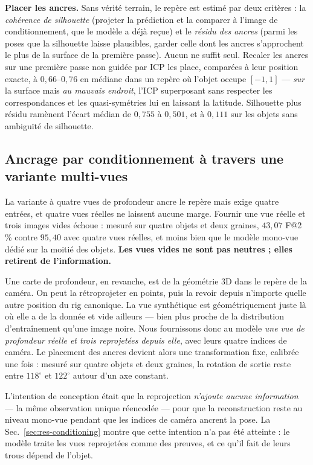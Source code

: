 \documentclass[conference]{IEEEtran}
\makeatletter
\newcommand{\Fs}{F@2\,\%}
\makeatother
\begin{document}
\textbf{Placer les ancres.} Sans vérité terrain, le repère est estimé par deux
critères : la \emph{cohérence de silhouette} (projeter la prédiction et la comparer à
l'image de conditionnement, que le modèle a déjà reçue) et le \emph{résidu des ancres}
(parmi les poses que la silhouette laisse plausibles, garder celle dont les ancres
s'approchent le plus de la surface de la première passe). Aucun ne suffit seul.
Recaler les ancres sur une première passe non guidée par ICP les place, comparées à
leur position exacte, à $0{,}66$--$0{,}76$ en médiane dans un repère où l'objet occupe
$[-1,1]$ --- \emph{sur} la surface mais \emph{au mauvais endroit}, l'ICP superposant
sans respecter les correspondances et les quasi-symétries lui en laissant la latitude.
Silhouette plus résidu ramènent l'écart médian de $0{,}755$ à $0{,}501$, et à
$0{,}111$ sur les objets sans ambiguïté de silhouette.

\subsection{Ancrage par conditionnement à travers une variante multi-vues}
\label{sec:conditioning}

La variante à quatre vues de profondeur ancre le repère mais exige quatre entrées, et
quatre vues réelles ne laissent aucune marge. Fournir une vue réelle et trois images
vides échoue : mesuré sur quatre objets et deux graines, $43{,}07$ \Fs{} contre
$95{,}40$ avec quatre vues réelles, et moins bien que le modèle mono-vue dédié sur la
moitié des objets. \textbf{Les vues vides ne sont pas neutres ; elles retirent de
l'information.}

Une carte de profondeur, en revanche, est de la géométrie 3D dans le repère de la
caméra. On peut la rétroprojeter en points, puis la revoir depuis n'importe quelle
autre position du rig canonique. La vue synthétique est géométriquement juste là où
elle a de la donnée et vide ailleurs --- bien plus proche de la distribution
d'entraînement qu'une image noire. Nous fournissons donc au modèle \emph{une vue de
profondeur réelle et trois reprojetées depuis elle}, avec leurs quatre indices de
caméra. Le placement des ancres devient alors une transformation fixe, calibrée une
fois : mesuré sur quatre objets et deux graines, la rotation de sortie reste entre
$118^\circ$ et $122^\circ$ autour d'un axe constant.

L'intention de conception était que la reprojection \emph{n'ajoute aucune
information} --- la même observation unique réencodée --- pour que la reconstruction
reste au niveau mono-vue pendant que les indices de caméra ancrent la pose. La
Sec.~\ref{sec:res-conditioning} montre que cette intention n'a pas été atteinte : le
modèle traite les vues reprojetées comme des preuves, et ce qu'il fait de leurs trous
dépend de l'objet.
\end{document}
